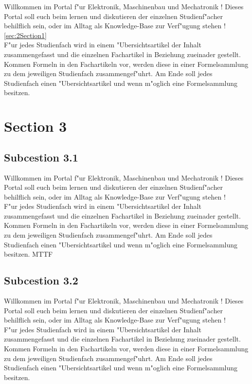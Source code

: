 Willkommen im Portal f"ur Elektronik, Maschinenbau und Mechatronik !
Dieses Portal soll euch beim lernen und diskutieren der einzelnen Studienf"acher behilflich sein, oder im Alltag als Knowledge-Base zur Verf"ugung stehen ! \ref{sec:2Section1} \\
F"ur jedes Studienfach wird in einem "Ubersichtsartikel der Inhalt zusammengefasst und die einzelnen Fachartikel in Beziehung zueinader gestellt. Kommen Formeln in den Fachartikeln vor, werden diese in einer Formelsammlung zu dem jeweiligen Studienfach zusammengef"uhrt. Am Ende soll jedes Studienfach einen "Ubersichtsartikel und wenn m"oglich eine Formelsammlung besitzen.

\section{Section 3}
\label{sec:2Section3}

\subsection{Subcestion 3.1}
\label{subsec:2Subcestion3.1}
Willkommen im Portal f"ur Elektronik, Maschinenbau und Mechatronik !
Dieses Portal soll euch beim lernen und diskutieren der einzelnen Studienf"acher behilflich sein, oder im Alltag als Knowledge-Base zur Verf"ugung stehen ! \\
F"ur jedes Studienfach wird in einem "Ubersichtsartikel der Inhalt zusammengefasst und die einzelnen Fachartikel in Beziehung zueinader gestellt. Kommen Formeln in den Fachartikeln vor, werden diese in einer Formelsammlung zu dem jeweiligen Studienfach zusammengef"uhrt. Am Ende soll jedes Studienfach einen "Ubersichtsartikel und wenn m"oglich eine Formelsammlung besitzen. \acs{MTTF}

\subsection{Subcestion 3.2}
\label{subsec:2Subcestion3.2}
Willkommen im Portal f"ur Elektronik, Maschinenbau und Mechatronik !
Dieses Portal soll euch beim lernen und diskutieren der einzelnen Studienf"acher behilflich sein, oder im Alltag als Knowledge-Base zur Verf"ugung stehen ! \\
F"ur jedes Studienfach wird in einem "Ubersichtsartikel der Inhalt zusammengefasst und die einzelnen Fachartikel in Beziehung zueinader gestellt. Kommen Formeln in den Fachartikeln vor, werden diese in einer Formelsammlung zu dem jeweiligen Studienfach zusammengef"uhrt. Am Ende soll jedes Studienfach einen "Ubersichtsartikel und wenn m"oglich eine Formelsammlung besitzen.

